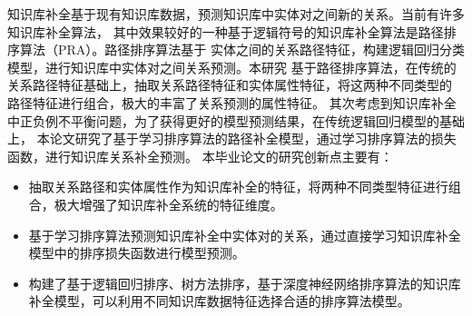 


\makeatother


\makeatother



\begin{cabstract}
  知识库补全基于现有知识库数据，预测知识库中实体对之间新的关系。当前有许多知识库补全算法，
  其中效果较好的一种基于逻辑符号的知识库补全算法是路径排序算法（PRA）。路径排序算法基于
  实体之间的关系路径特征，构建逻辑回归分类模型，进行知识库中实体对之间关系预测。本研究
  基于路径排序算法，在传统的关系路径特征基础上，抽取关系路径特征和实体属性特征，将这两种不同类型的
  路径特征进行组合，极大的丰富了关系预测的属性特征。
  其次考虑到知识库补全中正负例不平衡问题，为了获得更好的模型预测结果，在传统逻辑回归模型的基础上，  本论文研究了基于学习排序算法的路径补全模型，通过学习排序算法的损失函数，进行知识库关系补全预测。
  本毕业论文的研究创新点主要有：
  \begin{itemize}[$\bullet$]
    \item 抽取关系路径和实体属性作为知识库补全的特征，将两种不同类型特征进行组合，极大增强了知识库补全系统的特征维度。
    \item 基于学习排序算法预测知识库补全中实体对的关系，通过直接学习知识库补全模型中的排序损失函数进行模型预测。
    \item
        构建了基于逻辑回归排序、树方法排序，基于深度神经网络排序算法的知识库补全模型，可以利用不同知识库数据特征选择合适的排序算法模型。
  \end{itemize}
\end{cabstract}


